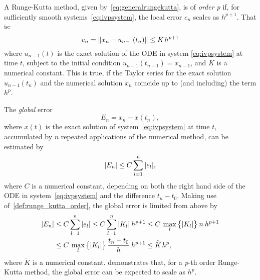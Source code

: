 \begin{defn}
    \label{def:runge_kutta_order}
    A Runge-Kutta method, given by~\cref{eq:generalrungekutta}, is of
    \emph{order p} if, for sufficiently smooth systems~\eqref{eq:ivpsystem},
    the local error $e_{n}$ scales as $h^{p+1}$. That is:
    \begin{equation}
        \label{eq:rungekuttaorder}
        e_{n} = \norm{x_{n}-u_{n-1}(t_{n})} \leq K{\mkern2mu}h^{p+1}
    \end{equation}
    where $u_{n-1}(t)$ is the exact solution of the ODE in system
    \eqref{eq:ivpsystem} at time $t$, subject to the initial condition
    $u_{n-1}(t_{n-1}) = x_{n-1}$, and $K$ is a numerical constant. This is true,
    if the Taylor series for the exact solution $u_{n-1}(t_{n})$ and the
    numerical solution $x_{n}$ coincide up to (and including) the term $h^{p}$.
\end{defn}%
The \emph{global} error
\begin{equation}
    \label{eq:globalrungekuttaerror}
    E_{n} = x_{n}-x(t_{n}),
\end{equation}
where $x(t)$ is the exact solution of system~\eqref{eq:ivpsystem} at time $t$,
accumulated by $n$ repeated applications of the numerical method, can be
estimated by
\begin{equation}
    \label{eq:globalrungekuttaerrorapprox}
    \abs{E_{n}} \leq C\sum\limits_{l=1}^{n}\abs{e_{l}},
\end{equation}
where $C$ is a numerical constant, depending on both the right hand side of the
ODE in system~\eqref{eq:ivpsystem} and the difference $t_{n}-t_{0}$. Making
use of~\cref{def:runge_kutta_order}, the global error is limited from above by
\begin{equation}
    \label{eq:globalrungekuttaerrorestimate}
    \begin{aligned}
        \abs{E_{n}} &\leq C\sum\limits_{l=1}^{n}\abs{e_{l}} %
        \leq C\sum\limits_{l=1}^{n}\abs{K_{l}}\hspace{0.5ex}h^{p+1}%
        \leq C\hspace{0.5ex}\max\limits_{l}\big\{\abs{K_{l}}\big\}%
        \hspace{0.5ex}n\hspace{0.5ex}h^{p+1}\\
        &\leq C\hspace{0.5ex}\max\limits_{l}\big\{\abs{K_{l}}\big\}%
        \hspace{0.5ex}\frac{t_{n}-t_{0}}{h}\hspace{0.5ex}h^{p+1}
        \leq \widetilde{K}{\mkern2mu}h^{p},
    \end{aligned}
\end{equation}
where $\widetilde{K}$ is a numerical constant.
 demonstrates that, for a \emph{p}-th
order Runge-Kutta method, the global error can be expected to scale as $h^{p}$.

